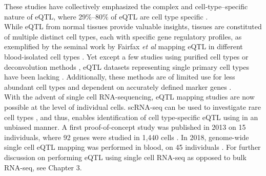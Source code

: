 These studies have collectively emphasized the complex and cell-type–specific nature of eQTL, where 29\%–80\% of eQTL are cell type specific \cite{dimas2009common, nica2011architecture, fairfax2012genetics, gtex2015genotype}. \\

While eQTL from normal tissues provide valuable insights, tissues are constituted of multiple distinct cell types, each with specific gene regulatory profiles, as exemplified by the seminal work by Fairfax \textit{et al} mapping eQTL in different blood-isolated cell types \cite{fairfax2012genetics}.
Yet except a few studies using purified cell types \cite{fairfax2012genetics, kasela2017pathogenic, naranbhai2015genomic} or deconvolution methods \cite{westra2015cell, venet2001separation},
eQTL datasets representing single primary cell types
have been lacking \cite{zhang2018cell}.
Additionally, these methods are 
of limited use for less abundant cell types and dependent on accurately defined marker genes \cite{zhernakova2017identification}. \\
 
With the advent of single cell RNA-sequencing, eQTL mapping studies are now possible at the level of individual cells. 
scRNA-seq can be used to investigate rare cell types \cite{villani2017single}, and thus, enables identification of cell type-specific eQTL using in an unbiased manner. 
A first proof-of-concept study was published in 2013 on 15 individuals, where 92 genes were studied in 1,440 cells \cite{wills2013single}.
In 2018, genome-wide single cell eQTL mapping was performed in blood, on 45 individuals \cite{van2018single}.
For further discussion on performing eQTL using single cell RNA-seq as opposed to bulk RNA-seq, see Chapter 3.

